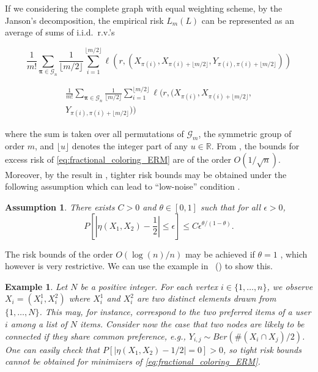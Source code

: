\documentclass[letterpaper]{article} %
\def\DoubleColumn{}
\def\DoubleColumnEnd{}
\def\SingleColumn{}
\def\SingleColumnEnd{}
\newtheorem{example}{Example}
\newtheorem{assumption}{Assumption}
\newcommand{\Pro}{P}
\newcommand{\real}{\mathbb{R}}
\newcommand{\empiricalrisk}[1]{L_{#1}}
\newcommand{\set}[1]{\{#1\}}
\newcommand{\citet}[1]{\citeauthor{#1}\ (\citeyear{#1})}
\begin{document}
If we considering the complete graph with equal weighting scheme, by the Janson's decomposition, the empirical risk $\empiricalrisk{m}(L)$ can be represented as an average of sums of i.i.d.\ r.v.'s
\SingleColumn
\begin{equation}
  \label{eq:fractional_coloring_ERM}
  \frac{1}{m!}\sum_{\bm{\pi}\in\mathcal{G}_n}\frac{1}{\lfloor m/2\rfloor}\sum_{i=1}^{\lfloor m/2 \rfloor} \ell(r, (X_{\pi(i)}, X_{\pi(i)+\lfloor m/2\rfloor}, Y_{\pi(i), \pi(i)+\lfloor m/2\rfloor}))
\end{equation}
\SingleColumnEnd
\DoubleColumn
\begin{equation}
\begin{aligned}
  \label{eq:fractional_coloring_ERM}
  \frac{1}{m!}\sum_{\bm{\pi}\in\mathcal{G}_n}\frac{1}{\lfloor m/2\rfloor}\sum_{i=1}^{\lfloor m/2 \rfloor} \ell(r, (X_{\pi(i)}, X_{\pi(i)+\lfloor m/2\rfloor}, \\
  Y_{\pi(i), \pi(i)+\lfloor m/2\rfloor}))
  \end{aligned}
\end{equation}
\DoubleColumnEnd
where the sum is taken over all permutations of $\mathcal{G}_m$, the symmetric group of order $m$, and $\lfloor u \rfloor$ denotes the integer part of any $u\in \real{}$.
From \cite{Biau2006}, the bounds for excess risk of \eqref{eq:fractional_coloring_ERM} are of the order $O(1/\sqrt{n})$.
Moreover, by the result in \cite{DBLP:conf/icml/RalaivolaA15}, tighter risk bounds may be obtained under the following assumption which can lead to ``low-noise'' condition \cite{tsybakov2004optimal,Massart2006}.
\begin{assumption}
  There exists $C>0$ and $\theta\in [0,1]$ such that for all $\epsilon>0$,
  \[\Pro\left[|\eta(X_1,X_2)-\frac{1}{2}|\le \epsilon\right]\le C\epsilon^{\theta/(1-\theta)}.\]
\end{assumption}
The risk bounds of the order $O(\log(n)/n)$ may be achieved if $\theta=1$ \cite{Massart2006}, which however is very restrictive.
We can use the example in \citet{papa2016graph} to show this.
\begin{example}
Let $N$ be a positive integer. For each vertex $i \in \set{1,\dots,n}$, we observe $X_i = (X_i^1, X_i^2)$ where $X_i^1$ and $X_i^2$ are two distinct elements drawn from $\set{1,\dots,N}$.
This may, for instance, correspond to the two preferred items of a user $i$ among a list of $N$ items.
Consider now the case that two nodes are likely to be connected if they share common preference, e.g., $Y_{i,j} \sim Ber(\#(X_i\cap X_j)/2)$. One can easily check that $\Pro[|\eta(X_1,X_2)-1/2|=0]>0$, so tight risk bounds cannot be obtained for minimizers of \eqref{eq:fractional_coloring_ERM}.
\end{example}
\end{document}
